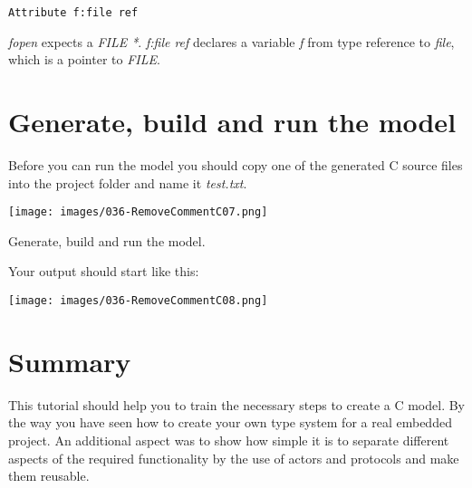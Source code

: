 \begin{verbatim}
Attribute f:file ref
\end{verbatim}

\textit{fopen} expects a \textit{FILE *}. \textit{f:file ref} declares a variable \textit{f} from type reference to \textit{file}, which is a pointer to \textit{FILE}.


\section{Generate, build and run the model}

Before you can run the model you should copy one of the generated C source files into the project folder and name it \textit{test.txt}. 

\texttt{[image: images/036-RemoveCommentC07.png]}

Generate, build and run the model.

Your output should start like this:

\texttt{[image: images/036-RemoveCommentC08.png]}


\section{Summary}

This tutorial should help you to train the necessary steps to create a C model. By the way you have seen how to create your own type system for a real embedded project. An additional aspect was to show how simple it is to separate different aspects of the required functionality by the use of actors and protocols and make them reusable.
